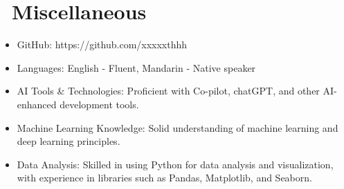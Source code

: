 \documentclass{resume}
\begin{document}
\section{\faInfo\ Miscellaneous}
\begin{itemize}[parsep=0.5ex]
  \item GitHub: https://github.com/xxxxxthhh
  \item Languages: English - Fluent, Mandarin - Native speaker
  \item AI Tools & Technologies: Proficient with Co-pilot, chatGPT, and other AI-enhanced development tools.
  \item Machine Learning Knowledge: Solid understanding of machine learning and deep learning principles.
  \item Data Analysis: Skilled in using Python for data analysis and visualization, with experience in libraries such as Pandas, Matplotlib, and Seaborn.
\end{itemize}

%
%
\end{document}
